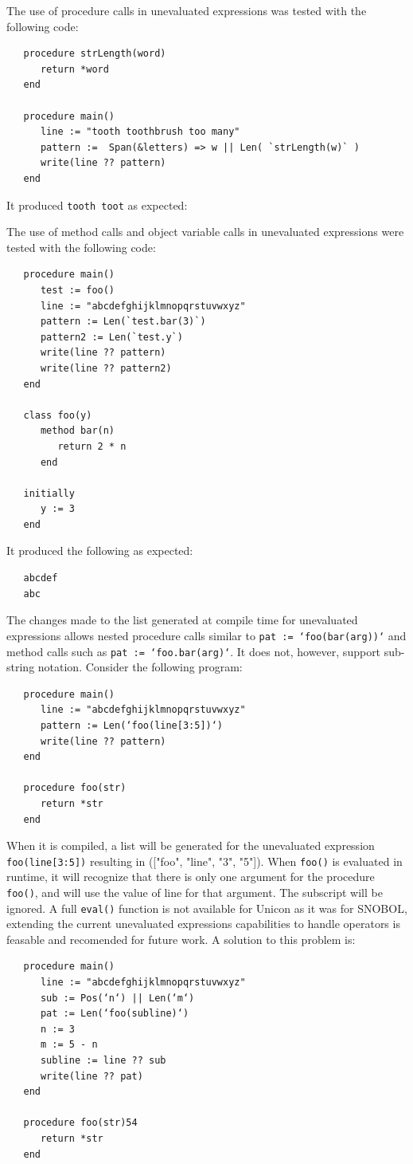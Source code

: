 \documentclass{article}
\begin{document}
The use of procedure calls in unevaluated expressions was tested with the following code:\\
\begin{verbatim}
   procedure strLength(word)
      return *word
   end

   procedure main()
      line := "tooth toothbrush too many"
      pattern :=  Span(&letters) => w || Len( `strLength(w)` )
      write(line ?? pattern)
   end
\end{verbatim}
\noindent It produced \texttt{tooth toot} as expected:

The use of method calls and object variable calls in unevaluated expressions were tested with the following code:\\
\begin{verbatim}
   procedure main()
      test := foo()
      line := "abcdefghijklmnopqrstuvwxyz"
      pattern := Len(`test.bar(3)`) 
      pattern2 := Len(`test.y`) 
      write(line ?? pattern)
      write(line ?? pattern2)
   end

   class foo(y)
      method bar(n)
         return 2 * n
      end

   initially
      y := 3
   end
\end{verbatim}
\noindent It produced the following as expected:\\
\begin{verbatim}
   abcdef
   abc
\end{verbatim}

\pagebreak
The changes made to the list generated at compile time for unevaluated expressions allows nested procedure calls similar to \texttt{pat := ‘foo(bar(arg))‘} and method calls such as \texttt{pat := ‘foo.bar(arg)‘}. It does not, however, support sub-string notation. Consider the following program:\\
\begin{verbatim}
   procedure main()
      line := "abcdefghijklmnopqrstuvwxyz"
      pattern := Len(‘foo(line[3:5])‘)
      write(line ?? pattern)
   end
   
   procedure foo(str)
      return *str
   end
\end{verbatim}

When it is compiled, a list will be generated for the unevaluated expression \texttt{foo(line[3:5])} resulting in (["foo", "line", "3", "5"]). When \texttt{foo()} is evaluated in runtime, it will recognize that there is only one argument for the procedure \texttt{foo()}, and will use the value of line for that argument. The subscript will be ignored.  A full \texttt{eval()} function is not available for Unicon as it was for SNOBOL, extending the current unevaluated expressions capabilities to handle operators is feasable and recomended for future work.  A solution to this problem is:\\
\begin{verbatim}
   procedure main()
      line := "abcdefghijklmnopqrstuvwxyz"
      sub := Pos(‘n‘) || Len(‘m‘)
      pat := Len(‘foo(subline)‘)
      n := 3
      m := 5 - n
      subline := line ?? sub
      write(line ?? pat)
   end
   
   procedure foo(str)54
      return *str
   end
\end{verbatim}
\end{document}
